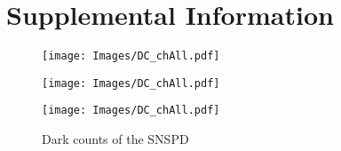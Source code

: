 \chapter{Supplemental Information}

\begin{figure}[h!]
	\noindent
	\begin{minipage}{0.33\textwidth}
		\texttt{[image: Images/DC\_chAll.pdf]}
	\end{minipage}%
	\begin{minipage}{0.33\textwidth}
		\texttt{[image: Images/DC\_chAll.pdf]}
	\end{minipage}%
	\begin{minipage}{0.33\textwidth}
		\texttt{[image: Images/DC\_chAll.pdf]}
	\end{minipage}
	\caption{Dark counts of the SNSPD}
	\label{fig:DC}
\end{figure}